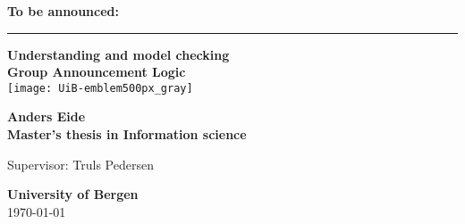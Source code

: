 %
%




\begin{titlepage}
\begin{center}

\Huge \textbf{To be announced:}


\rule {8cm}{1pt} \break
\LARGE \textbf{{Understanding and model checking \\ 
Group Announcement Logic}} \\

\vspace{3cm}
\texttt{[image: UiB-emblem500px\_gray]}
\vfill

\textbf{
\Large Anders Eide \\[0.2cm]
\large Master's thesis in Information science \\
}

\vspace{10mm}

{\large Supervisor: Truls Pedersen}\\

\vspace{15mm}

{\Large \textbf{University of Bergen}} \\

{\large \today}

\end{center}
\end{titlepage}

\restoregeometry

\blankpage %